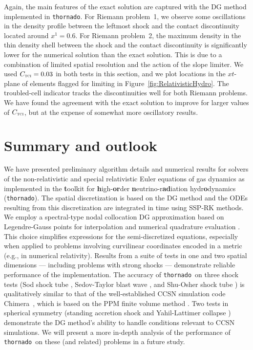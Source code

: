 \documentclass[letterpaper]{jpconf}
\newcommand{\TCI}{\textnormal{\tiny\textsc{TCI}}}
\newcommand{\thornado}{\texttt{thornado}}
\newcommand{\chimera}{{\sc Chimera}}
\begin{document}
Again, the main features of the exact solution are captured with the DG method implemented in \thornado.  
For Riemann problem~1, we observe some oscillations in the density profile between the leftmost shock and the contact discontinuity located around $x^{1}=0.6$.  
For Riemann problem~2, the maximum density in the thin density shell between the shock and the contact discontinuity is significantly lower for the numerical solution than the exact solution.  
This is due to a combination of limited spatial resolution and the action of the slope limiter.  
We used $C_{\TCI}=0.03$ in both tests in this section, and we plot locations in the $xt$-plane of elements flagged for limiting in Figure~\ref{fig:RelativisticHydro}.  
The troubled-cell indicator tracks the discontinuities well for both Riemann problems.  
We have found the agreement with the exact solution to improve for larger values of $C_{\TCI}$, but at the expense of somewhat more oscillatory results.  

\section{Summary and outlook}

We have presented preliminary algorithm details and numerical results for solvers of the non-relativistic and special relativistic Euler equations of gas dynamics as implemented in the {\bf t}oolkit for {\bf h}igh-{\bf or}der {\bf n}eutrino-r{\bf ad}iation hydr{\bf o}dynamics (\thornado).  
The spatial discretization is based on the DG method and the ODEs resulting from this discretization are integrated in time using SSP-RK methods.  
We employ a spectral-type nodal collocation DG approximation based on Legendre-Gauss points for interpolation and numerical quadrature evaluation \cite{bassi_etal_2013}.  
This choice simplifies expressions for the semi-discretized equations, especially when applied to problems involving curvilinear coordinates encoded in a metric (e.g., in numerical relativity).  
Results from a suite of tests in one and two spatial dimensions --- including problems with strong shocks --- demonstrate reliable performance of the implementation.  
The accuracy of \thornado\ on three shock tests (Sod shock tube \cite{sod_1978}, Sedov-Taylor blast wave \cite{sedov_1959}, and Shu-Osher shock tube \cite{shuOsher_1989}) is qualitatively similar to that of the well-established CCSN simulation code \chimera\ \cite{bruenn_etal_2018}, which is based on the PPM finite volume method \cite{colellaWoodward_1984}.  
Two tests in spherical symmetry (standing accretion shock \cite{blondin_etal_2003} and Yahil-Lattimer collapse \cite{yahilLattimer_1982,yahil_1983}) demonstrate the DG method's ability to handle conditions relevant to CCSN simulations.  
We will present a more in-depth analysis of the performance of \thornado\ on these (and related) problems in a future study.  
\end{document}

